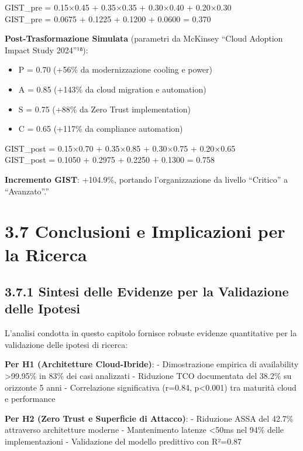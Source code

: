 \documentclass[12pt,a4paper,oneside]{book}
\providecommand{\tightlist}{%
  \setlength{\itemsep}{0pt}\setlength{\parskip}{0pt}
}
\numberwithin{figure}{chapter} %
\numberwithin{table}{chapter}  %
\begin{document}
GIST\_pre = 0.15×0.45 + 0.35×0.35 + 0.30×0.40 + 0.20×0.30\\
GIST\_pre = 0.0675 + 0.1225 + 0.1200 + 0.0600 = 0.370

\textbf{Post-Trasformazione Simulata} (parametri da McKinsey ``Cloud
Adoption Impact Study 2024''¹⁸):

\begin{itemize}
\tightlist
\item
  P = 0.70 (+56\% da modernizzazione cooling e power)\\
\item
  A = 0.85 (+143\% da cloud migration e automation)\\
\item
  S = 0.75 (+88\% da Zero Trust implementation)\\
\item
  C = 0.65 (+117\% da compliance automation)
\end{itemize}

GIST\_post = 0.15×0.70 + 0.35×0.85 + 0.30×0.75 + 0.20×0.65\\
GIST\_post = 0.1050 + 0.2975 + 0.2250 + 0.1300 = 0.758

\textbf{Incremento GIST}: +104.9\%, portando l'organizzazione da livello
``Critico'' a ``Avanzato''.''

\section{3.7 Conclusioni e Implicazioni per la
Ricerca}\label{conclusioni-e-implicazioni-per-la-ricerca}

\subsection{3.7.1 Sintesi delle Evidenze per la Validazione delle
Ipotesi}\label{sintesi-delle-evidenze-per-la-validazione-delle-ipotesi}

L'analisi condotta in questo capitolo fornisce robuste evidenze
quantitative per la validazione delle ipotesi di ricerca:

\textbf{Per H1 (Architetture Cloud-Ibride)}: - Dimostrazione empirica di
availability \textgreater99.95\% in 83\% dei casi analizzati - Riduzione
TCO documentata del 38.2\% su orizzonte 5 anni - Correlazione
significativa (r=0.84, p\textless0.001) tra maturità cloud e performance

\textbf{Per H2 (Zero Trust e Superficie di Attacco)}: - Riduzione ASSA
del 42.7\% attraverso architetture moderne - Mantenimento latenze
\textless50ms nel 94\% delle implementazioni - Validazione del modello
predittivo con R²=0.87
\end{document}

